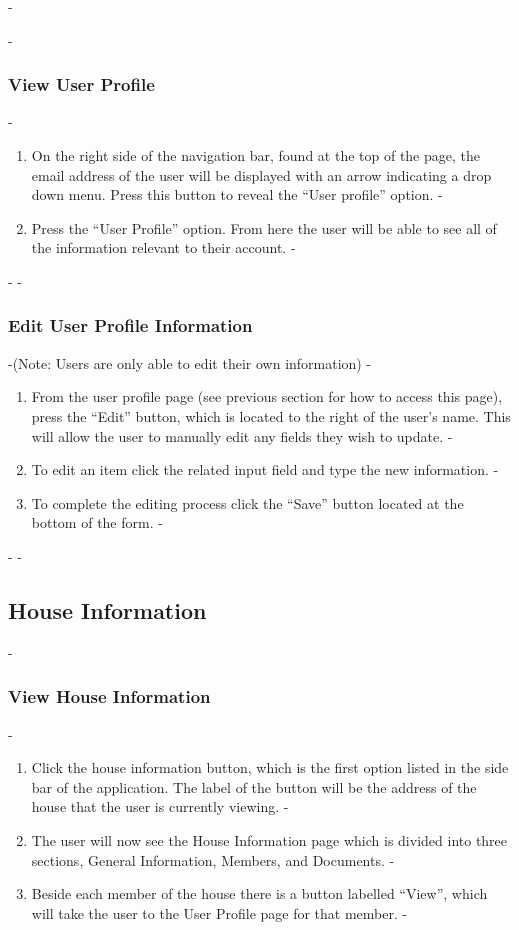 -\documentclass[12pt]{article}
\begin{document}
 -\subsubsection{View User Profile}
 -\begin{enumerate}
 -\item On the right side of the navigation bar, found at the top of the page, the email address of the user will be displayed with an arrow indicating a drop down menu. Press this button to reveal the ``User profile'' option.
 -\item Press the ``User Profile'' option. From here the user will be able to see all of the information relevant to their account.
 -\end{enumerate}
 -
 -\subsubsection{Edit User Profile Information}
 -(Note: Users are only able to edit their own information)
 -\begin{enumerate}
 -\item From the user profile page (see previous section for how to access this page), press the ``Edit'' button, which is located to the right of the user's name. This will allow the user to manually edit any fields they wish to update.
 -\item To edit an item click the related input field and type the new information.
 -\item To complete the editing process click the ``Save'' button located at the bottom of the form.
 -\end{enumerate}
 -
 -\subsection{House Information} %
 -\subsubsection{View House Information}
 -\begin{enumerate}
 -\item Click the house information button, which is the first option listed in the side bar of the application. The label of the button will be the address of the house that the user is currently viewing.
 -\item The user will now see the House Information page which is divided into three sections, General Information, Members, and Documents.
 -\item Beside each member of the house there is a button labelled ``View'', which will take the user to the User Profile page for that member.
 -\end{enumerate}
\end{document}
